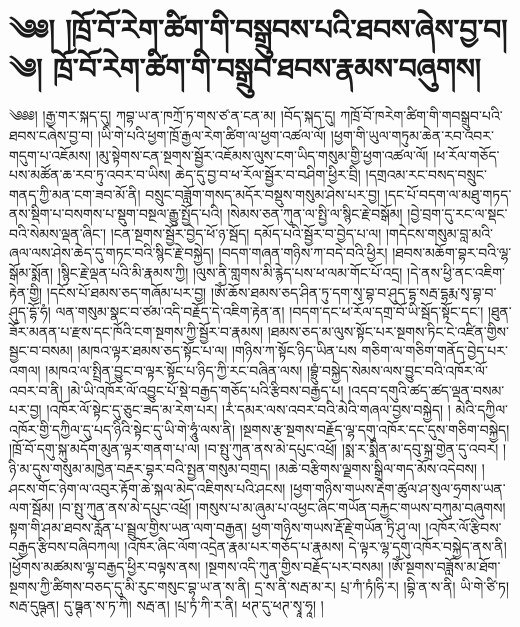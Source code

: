 \chapter{༄༅། །ཁྲོ་བོ་རེག་ཚིག་གི་བསྒྲུབས་པའི་ཐབས་ཞེས་བྱ་བ། ༄། ཁྲོ་བོ་རེག་ཚིག་གི་བསྒྲུབ་ཐབས་རྣམས་བཞུགས། }༄༅༅། །རྒྱ་གར་སྐད་དུ། ཀབྷ་ཡ་ན་ཁཀྲོ་ཏ་གས་ཙ་ན་ངན་མ། །བོད་སྐད་དུ། ཀཁྲོ་བོ་ཁརེག་ཚིག་གི་གབསྒྲུབ་པའི་ཐབས་ངཞེས་བྱ་བ། །ཡི་གེ་པའི་ཕྱག་ཁྲོ་རྒྱལ་རེག་ཚིག་ལ་ཕྱག་འཚལ་ལོ། །ཕྱག་གི་ཡུལ་གཏུམ་ཆེན་རབ་འབར་གདུག་པ་འཇོམས། །མུ་སྟེགས་ངན་སྔགས་སྦྱོར་འཇོམས་ལུས་ངག་ཡིད་གསུམ་གྱི་ཕྱག་འཚལ་ལོ། །ཕ་རོལ་གཅོད་པས་མཚོན་ཆ་རབ་ཏུ་འབར་བ་ཡིས། ཆེད་དུ་བྱ་བ་ཕ་རོལ་སྦྱོར་བ་བཤིག་ཕྱིར་བྲི། །དགྲའམ་རང་བསད་བསྲུང་གནད་ཀྱི་མན་ངག་ཟབ་མོ་ནི། བསྲུང་བཟློག་གསད་མདོར་བསྡུས་གསུམ་ཤེས་པར་བྱ། །དང་པོ་བདག་ལ་མཐུ་གཏད་ནས་སྡིག་པ་བསགས་པ་སྡུག་བསྔལ་རྒྱུ་སྤྱོད་པའི། །སེམས་ཅན་ཀུན་ལ་སྤྱི་ལ་སྙིང་རྗེ་བསྒོམ། །བྱེ་བྲག་དུ་རང་ལ་སྡང་བའི་སེམས་ལྡན་ཞིང་། །ངན་སྔགས་སྦྱོར་བྱེད་ཕོ་ཉ་སྦོད། དམོད་པའི་སྦྱོར་བ་བྱེད་པ་ལ། །གདེངས་གསུམ་བླ་མའི་ཞལ་ལས་ཤེས་ཆེད་དུ་གཏང་བའི་སྙིང་རྗེ་བསྐྱེད། །བདག་གཞན་གཉིས་ཀ་བདེ་བའི་ཕྱིར། །ཐབས་མཆོག་བྷར་བའི་ལྷ་སྒོམ་སྨོན། །སྙིང་རྗེ་ལྡན་པའི་མི་རྣམས་ཀྱི། །ལུས་ནི་གླགས་མི་རྙེད་པས་ཕ་ལམ་གོང་པོ་འདྲ། །དེ་ནས་ཕྱི་ནང་འཇིག་རྟེན་གྱི། །དངོས་པོ་ཐམས་ཅད་གཞོམ་པར་བྱ། །ཨོཾ་ཆོས་ཐམས་ཅད་ཤིན་ཏུ་དག་སྭ་བྷ་བ་ཤུད་དྷ་སརྦ་དྷརྨ་སྭ་བྷ་བ་ཤུད་དྷོ་ཧཾ། ལན་གསུམ་སྣང་བ་ཙམ་འདི་བརྗོད་དེ་འཇིག་རྟེན་ན། །བདག་དང་ཕ་རོལ་དགྲ་བོ་ཡི་སྦོད་སྟོང་དང་། །ཐུན་ཟོར་མནན་པ་རྫས་དང་ཁོའི་ངག་སྔགས་ཀྱི་སྦྱོར་བ་རྣམས། །ཐམས་ཅད་མ་ལུས་སྟོང་པར་སྔགས་ཏིང་ངེ་འཛིན་གྱིས་སྦྱང་བ་བསམ། །མཁའ་ལྟར་ཐམས་ཅད་སྟོང་པ་ལ། །གཉིས་ཀ་སྟོང་ཉིད་ཡིན་པས གཅིག་ལ་གཅིག་གནོད་བྱེད་པར་འགལ། །མཁའ་ལ་སྤྲིན་བྱུང་བ་ལྟར་སྟོང་པ་ཉིད་ཀྱི་རང་བཞིན་ལས། །བྷྲུཾ་བསྐྱེད་སེམས་ལས་བྱུང་བའི་འཁོར་ལོ་འབར་བ་ནི། །མེ་ཡི་འཁོར་ལོ་འབྱུང་པོ་སྡེ་བརྒྱད་གཅོད་པའི་རྩིབས་བརྒྱད་པ། །འདབ་དགུའི་ཚད་ཚད་ལྡན་བསམ་པར་བྱ། །འཁོར་ལོ་སྟེང་དུ་ཅུང་ཟད་མ་རེག་པར། །རཾ་དམར་ལས་འབར་བའི་མེའི་གཞལ་བྱས་བསྐྱེད། ། མེའི་དཀྱིལ་འཁོར་གྱི་དཀྱིལ་དུ་པད་ཉིའི་སྟེང་དུ་ཡི་གེ་ཧཱུཾ་ལས་ནི། །སྔགས་རྩ་སྔགས་བརྗོད་ལྷ་དགུ་འཁོར་དང་དུས་གཅིག་བསྐྱེད། །ཁྲོ་བོ་དགུ་སྐུ་མདོག་མུན་ལྟར་གནག་པ་ལ། །བ་སྤུ་ཀུན་ནས་མེ་དཔུང་འཕྲོ། །སྨ་ར་སྨིན་མ་དབུ་སྐྲ་གྱེན་དུ་འབར། །ཉི་མ་དུས་གསུམ་མཁྱེན་བརྡར་བྷར་བའི་སྤྱན་གསུམ་བགྲད། །མཆེ་བརྩིགས་ལྗགས་སྒྲིལ་གད་མོས་འདེབས། །ཤངས་གོང་ཉེག་ལ་འབུར་རྟོག་ཆེ་སྐལ་མེད་འཇིགས་པའི་ཤངས། །ཕྱག་གཉིས་གཡས་རྡེག་ཚུལ་ཤ་སུལ་ཧྲགས་ཡན་ལག་སྦོམ། །བ་སྤུ་ཀུན་ནས་མེ་དཔུང་འཕྲོ། །གསུས་པ་མ་ཞུམ་པ་འཕྱང་ཞིང་གཡོན་བརྐྱང་གཡས་བཀུམ་བཞུགས། སྟག་གི་ཤམ་ཐབས་རློན་པ་སྦྲུལ་གྱིས་ཡན་ལག་བརྒྱན། ཕྱག་གཉིས་གཡས་རྡོ་རྗེ་གཡོན་ཏྲི་ཤུ་ལ། །འཁོར་ལོ་རྩིབས་བརྒྱད་རྩིབས་བཞིབཀལ། །འཁོར་ཞིང་ལོག་འདྲེན་རྣམ་པར་གཅོད་པ་རྣམས། དེ་ལྟར་ལྷ་དགུ་འཁོར་བསྐྱེད་ནས་ནི། །ཕྱོགས་མཚམས་ལྷ་བརྒྱད་ཕྱིར་བལྟས་ནས། །སྔགས་འདི་ཀུན་གྱིས་བརྗོད་པར་བསམ། །ཨོཾ་སྔགས་བཟློས་མ་ཐོག་སྔགས་ཀྱི་ཚིགས་བཅད་དུ་མི་རུང་གསུང་བྷ་ཡ་ན་ས་ནི། དྲ་ས་ནི་སརྦ་མ་ར། པྲ་ཀཾ་ཏཾ།ཧི་ར། །བྷི་ན་ས་ནི། ཡི་གེ་ཙི་ཏ། སརྦ་དུཥྚན། དུ་ཋྚན་ས་ཏ་ཀི། སརྦ་ན། །པྲ་ཏཾ་ཀི་ར་ནི། ཕཊ་དུ་ཕཊ་སྭཱ་ཧཱ། །
